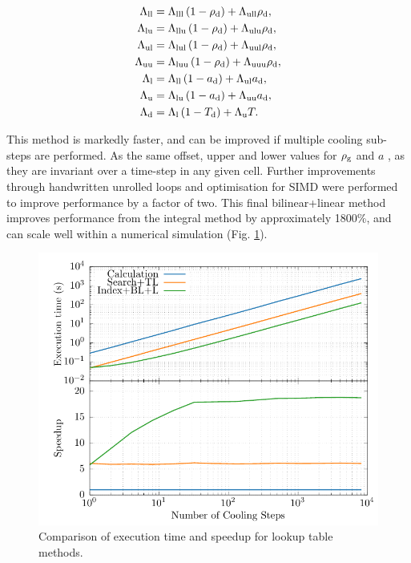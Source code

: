 \begin{equation}
  \begin{split}
    \Lambda_\text{ll} &=\Lambda_\text{lll}\left(1-\rho_\text{d}\right)+\Lambda_\text{ull} \rho_\text{d}, \\
    \Lambda_\text{lu} &=\Lambda_\text{llu}\left(1-\rho_\text{d}\right)+\Lambda_\text{ulu} \rho_\text{d}, \\
    \Lambda_\text{ul} &=\Lambda_\text{lul}\left(1-\rho_\text{d}\right)+\Lambda_\text{uul} \rho_\text{d}, \\
    \Lambda_\text{uu} &=\Lambda_\text{luu}\left(1-\rho_\text{d}\right)+\Lambda_\text{uuu} \rho_\text{d}, \\
    \Lambda_\text{l} &=\Lambda_\text{ll}\left(1-a_\text{d}\right)+\Lambda_\text{ul} a_\text{d}, \\
    \Lambda_\text{u} &=\Lambda_\text{lu}\left(1-a_\text{d}\right)+\Lambda_\text{uu} a_\text{d}, \\
    \Lambda_\text{d} &=\Lambda_\text{l}\left(1-T_\text{d}\right)+\Lambda_\text{u} T.
  \end{split}
\end{equation}

\noindent
This method is markedly faster, and can be improved if multiple cooling sub-steps are performed.
As the same offset, upper and lower values for $\rho_\text{g}$ and $a$ , as they are invariant over a time-step in any given cell.
Further improvements through handwritten unrolled loops and optimisation for SIMD were performed to improve performance by a factor of two.
This final bilinear+linear method improves performance from the integral method by approximately \num{1800}\%, and can scale well within a numerical simulation (Fig. \ref{fig:dust-opt-speedup}).

\begin{figure}[ht]
  \centering
  \includegraphics{assets/lambda-dust-speedup/lambda-dust-speedup.pdf}
  \caption[Dust lookup table methods comparison]{Comparison of execution time and speedup for lookup table methods.}
  \label{fig:dust-opt-speedup}
\end{figure}


